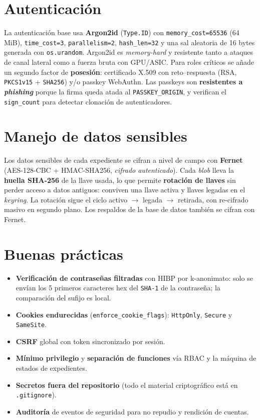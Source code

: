 \documentclass[10pt,letterpaper]{report}
\begin{document}
\section{Autenticaci\'on}
La autenticaci\'on base usa \textbf{Argon2id} (\texttt{Type.ID}) con \texttt{memory\_cost=65536}
(64\,MiB), \texttt{time\_cost=3}, \texttt{parallelism=2}, \texttt{hash\_len=32} y una sal aleatoria de
16 bytes generada con \texttt{os.urandom}. Argon2id es \emph{memory-hard} y resistente tanto a ataques
de canal lateral como a fuerza bruta con GPU/ASIC. Para roles cr\'iticos se a\~nade un segundo factor
de \textbf{posesi\'on}: certificado X.509 con reto--respuesta (RSA, \texttt{PKCS1v15} + \texttt{SHA256})
y/o passkey WebAuthn. Las passkeys son \textbf{resistentes a \emph{phishing}} porque la firma queda
atada al \texttt{PASSKEY\_ORIGIN}, y verifican el \texttt{sign\_count} para detectar clonaci\'on de
autenticadores.

\section{Manejo de datos sensibles}
Los datos sensibles de cada expediente se cifran a nivel de campo con \textbf{Fernet}
(AES-128-CBC + HMAC-SHA256, \emph{cifrado autenticado}). Cada \emph{blob} lleva la \textbf{huella
SHA-256} de la llave usada, lo que permite \textbf{rotaci\'on de llaves} sin perder acceso a datos
antiguos: conviven una llave activa y llaves legadas en el \emph{keyring}. La rotaci\'on sigue el
ciclo activo $\rightarrow$ legada $\rightarrow$ retirada, con re-cifrado masivo en segundo plano. Los
respaldos de la base de datos tambi\'en se cifran con Fernet.

\section{Buenas pr\'acticas}
\begin{itemize}
  \item \textbf{Verificaci\'on de contrase\~nas filtradas} con HIBP por k-anonimato: solo se env\'ian
  los 5 primeros caracteres hex del \texttt{SHA-1} de la contrase\~na; la comparaci\'on del sufijo es
  local.
  \item \textbf{Cookies endurecidas} (\texttt{enforce\_cookie\_flags}): \texttt{HttpOnly},
  \texttt{Secure} y \texttt{SameSite}.
  \item \textbf{CSRF} global con token sincronizado por sesi\'on.
  \item \textbf{M\'inimo privilegio} y \textbf{separaci\'on de funciones} v\'ia RBAC y la m\'aquina de
  estados de expedientes.
  \item \textbf{Secretos fuera del repositorio} (todo el material criptogr\'afico est\'a en
  \texttt{.gitignore}).
  \item \textbf{Auditor\'ia} de eventos de seguridad para no repudio y rendici\'on de cuentas.
\end{itemize}
\end{document}

